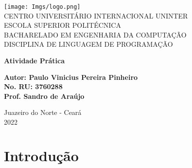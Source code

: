 \documentclass[
	12pt,				%
	openright,			%
	oneside,			%
	a4paper,			%
	chapter=TITLE,		%
	section=TITLE,		%
	english,			%
	french,				%
	spanish,			%
	brazil				%
	]{abntex2}
\begin{document}
\frenchspacing 

\begin{capa}
	\begin{center}
		\ABNTEXchapterfont\large{
			\texttt{[image: Imgs/logo.png]}\\
			CENTRO UNIVERSITÁRIO INTERNACIONAL UNINTER\\
			ESCOLA SUPERIOR POLITÉCNICA\\
			BACHARELADO EM ENGENHARIA DA COMPUTAÇÃO\\
			DISCIPLINA DE LINGUAGEM DE PROGRAMAÇÃO
		}
		\vfill

		\ABNTEXchapterfont\bfseries\LARGE{
			Atividade Prática
		}
	
		\vspace*{2cm}

		\begin{flushright}
			\ABNTEXchapterfont\bfseries\normalsize{
				Autor: Paulo Vinicius Pereira Pinheiro\\
				No. RU: 3760288\\
				Prof. Sandro de Araújo
			}
		\end{flushright}
		
		\vfill

		\ABNTEXchapterfont\normalsize{
			Juazeiro do Norte - Ceará\\
			2022			
		}
	\end{center}
\end{capa}


\listoffigures*
\cleardoublepage

\lstlistoflistings
\pagebreak


\tableofcontents*



\textual
\chapter*[INTRODUÇÃO]{\bfseries{Introdução}}
\end{document}
